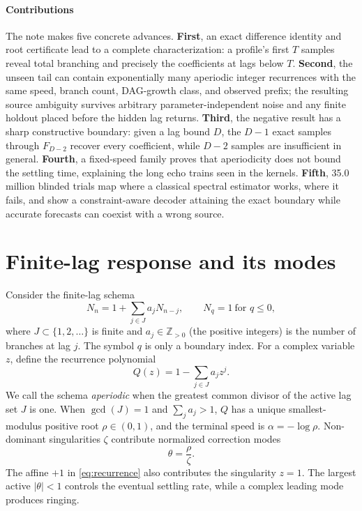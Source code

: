 \documentclass[10pt,twocolumn]{article}
\theoremstyle{cleanprop}
\begin{document}
\paragraph{Contributions}
The note makes five concrete advances. \textbf{First}, an exact difference
identity and root certificate lead to a complete characterization: a
profile's first $T$ samples reveal total branching and precisely the coefficients at
lags below $T$. \textbf{Second}, the unseen tail can contain exponentially many
aperiodic integer recurrences with the same speed, branch count, DAG-growth
class, and observed prefix; the resulting source ambiguity survives arbitrary
parameter-independent noise and any finite holdout placed before the hidden
lag returns. \textbf{Third}, the negative result has a sharp constructive
boundary: given a lag bound $D$, the $D-1$ exact samples through $F_{D-2}$
recover every coefficient, while $D-2$ samples are insufficient in general.
\textbf{Fourth}, a fixed-speed family proves that
aperiodicity does not bound the settling time, explaining the long echo trains
seen in the kernels. \textbf{Fifth}, 35.0 million blinded trials map where a
classical spectral estimator works, where it fails, and show a
constraint-aware decoder attaining the exact boundary while accurate forecasts
can coexist with a wrong source.

\section{Finite-lag response and its modes}

Consider the finite-lag schema
\begin{equation}
N_n=1+\sum_{j\in J}a_jN_{n-j},\qquad N_q=1\ \text{for }q\le0,
\label{eq:recurrence}
\end{equation}
where $J\subset\{1,2,\ldots\}$ is finite and
$a_j\in\mathbb{Z}_{>0}$ (the positive integers) is the number of branches at
lag $j$. The symbol $q$ is only a boundary index. For a complex variable $z$,
define the recurrence polynomial
\[
Q(z)=1-\sum_{j\in J}a_jz^j.
\]
We call the schema \emph{aperiodic} when the greatest common divisor of the
active lag set $J$ is one.
When $\gcd(J)=1$ and $\sum_j a_j>1$, $Q$ has a unique smallest-modulus
positive root $\rho\in(0,1)$, and the terminal speed is
$\alpha=-\log\rho$. Non-dominant singularities $\zeta$ contribute normalized
correction modes
\[
\theta=\frac{\rho}{\zeta}.
\]
The affine $+1$ in \eqref{eq:recurrence} also contributes the singularity
$z=1$. The largest active $|\theta|<1$ controls the eventual settling rate,
while a complex leading mode produces ringing.
\end{document}
